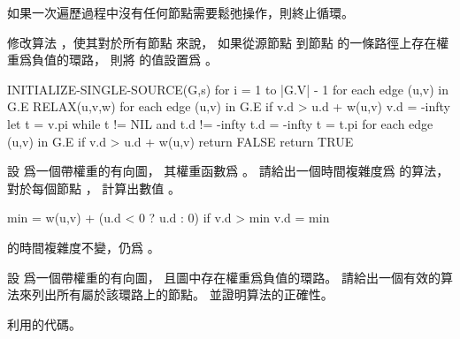 \startANSWER
如果一次遍歷過程中沒有任何節點需要鬆弛操作，則終止循環。
\stopANSWER

\startEXERCISE[exercise:24.1-4]
修改算法 ，使其對於所有節點  來說，
如果從源節點  到節點  的一條路徑上存在權重爲負值的環路，
則將  的值設置爲 \m{-\infty}。
\stopEXERCISE

\startANSWER
{}
\startCLRS
INITIALIZE-SINGLE-SOURCE(G,s)
for i = 1 to |G.V| - 1
	for each edge (u,v) in G.E
		RELAX(u,v,w)
for each edge (u,v) in G.E
	if v.d > u.d + w(u,v)
		v.d = -infty
		let t = v.pi
		while t != NIL and t.d != -infty
			t.d = -infty
			t = t.pi
for each edge (u,v) in G.E
	if v.d > u.d + w(u,v)
		return FALSE
return TRUE
\stopCLRS
\stopANSWER

\startEXERCISE\DIFFICULT
設  爲一個帶權重的有向圖，
其權重函數爲 。
請給出一個時間複雜度爲  的算法，
對於每個節點 ，
計算出數值 。
\stopEXERCISE

\startANSWER
{}
\startCLRS
min = w(u,v) + (u.d < 0 ? u.d : 0)
if v.d > min
	v.d = min
\stopCLRS

 的時間複雜度不變，仍爲 。
\stopANSWER

\startEXERCISE\DIFFICULT
設  爲一個帶權重的有向圖，
且圖中存在權重爲負值的環路。
請給出一個有效的算法來列出所有屬於該環路上的節點。
並證明算法的正確性。
\stopEXERCISE

\startANSWER
利用\inexercise[24.1-4] 的代碼。
\stopANSWER

\stopsection
